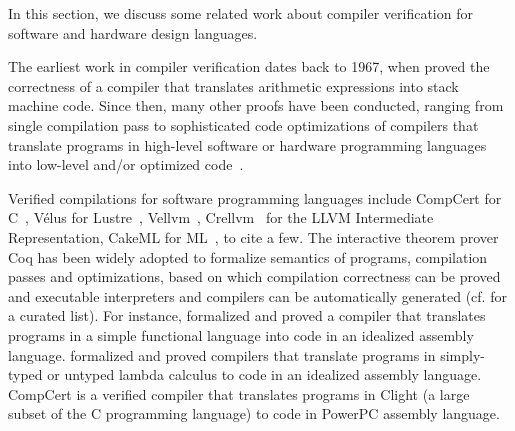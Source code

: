 
In this section, we discuss some related work about compiler verification for software and hardware design languages. 

The earliest work in compiler verification dates back to 1967,
when \cite{MP67} proved the correctness of a compiler that translates
arithmetic expressions into stack
machine code. Since then, many other proofs have been conducted, ranging from
single compilation pass to sophisticated code optimizations of compilers
that translate programs in high-level software or hardware programming languages into low-level and/or optimized code~\cite{Dave03}.
 
Verified compilations for software programming languages
include CompCert for C~\cite{Leroy09,kastner2018compcert,Leroy2006,Leroy-BKSPF-2016,BlazyDL06,Kastner-LBSSF-2017},
V\'{e}lus for Lustre~\cite{BourkeBDLPR17}, Vellvm~\cite{ZhaoNMZ12,ZhaoNMZ13}, Crellvm~\cite{KangKSLPSKCCHY18} for the LLVM Intermediate Representation,
CakeML for ML~\cite{KumarMNO14,LoowKTMNAF19,TanMKFON19,OwensNKMT17}, to cite a few.
The interactive theorem prover Coq has been widely adopted to formalize semantics of programs,
compilation passes and optimizations, based on which compilation correctness can be proved and
executable interpreters and compilers can be automatically generated (cf. \cite{Awesomecoq} for a curated list).
For instance, \cite{benton2009} formalized and proved a compiler that translates programs in a simple functional language into code in an idealized assembly language.
\cite{Chlipala07,Chlipala10} formalized and proved compilers that translate programs in simply-typed or untyped lambda calculus to code in an idealized assembly language.
CompCert is a verified compiler that translates programs in Clight (a large subset of the C programming
language) to code in PowerPC assembly language.



